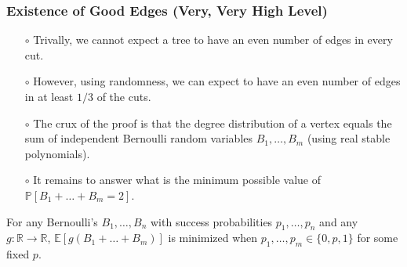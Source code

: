 \documentclass{beamer}
\newcommand{\RR}{\mathbb{R}}
\newcommand{\EE}{\mathbb{E}}
\newcommand{\PP}{\mathbb{P}}
\begin{document}
  \begin{frame}
    \frametitle{Existence of Good Edges (Very, Very High Level)}

    \pause
  
    \begin{itemize}
      \item[$\circ$] Trivally, we cannot expect a tree to have an even number of edges in every cut. \pause
      \item[$\circ$] However, using randomness, we can expect to have an even number of edges in at least $1/3$ of the cuts. \pause
      \item[$\circ$] The crux of the proof is that the degree distribution of a vertex equals the sum of independent Bernoulli random variables $B_1, \ldots, B_m$ (using real stable polynomials). \pause
      \item[$\circ$] It remains to answer what is the minimum possible value of $\PP[B_1 + \ldots + B_m = 2]$.
    \end{itemize}

    \pause

    \begin{theorem}[Hoeffding, 1956]
      For any Bernoulli's $B_1, \ldots, B_n$ with success probabilities $p_1, \ldots, p_n$ and any $g : \RR \to \RR$, $\EE[g(B_1 + \ldots + B_m)]$ is minimized when $p_1, \ldots, p_m \in \{ 0, p, 1 \}$ for some fixed $p$.
    \end{theorem}
  
  \end{frame}
\end{document}
